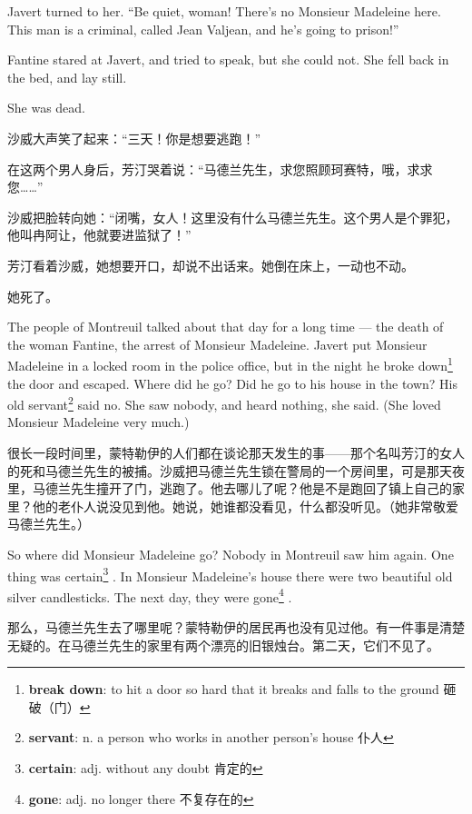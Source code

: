 \documentclass[fontset=ubuntu, zihao=5]{ctexart}
\begin{document}
\begin{paracol}{2}
  Javert turned to her. ``Be quiet, woman! There's no Monsieur Madeleine here. This man is a criminal, called Jean Valjean, and he's going to prison!''

  Fantine stared at Javert, and tried to speak, but she could not. She fell back in the bed, and lay still.

  She was dead.


  \switchcolumn

  沙威大声笑了起来：“三天！你是想要逃跑！”

  在这两个男人身后，芳汀哭着说：“马德兰先生，求您照顾珂赛特，哦，求求您……”


  沙威把脸转向她：“闭嘴，女人！这里没有什么马德兰先生。这个男人是个罪犯，他叫冉阿让，他就要进监狱了！”


  芳汀看着沙威，她想要开口，却说不出话来。她倒在床上，一动也不动。


  她死了。

  \switchcolumn*

  The people of Montreuil talked about that day for a long time --- the death of the woman Fantine, the arrest of Monsieur Madeleine. Javert put Monsieur Madeleine in a locked room in the police office, but in the night he broke down\footnote{\textbf{break down}: to hit a door so hard that it breaks and falls to the ground 砸破（门）}
  the door and escaped. Where did he go? Did he go to his house in the town? His old servant\footnote{\textbf{servant}: n. a person who works in another person's house 仆人}
  said no. She saw nobody, and heard nothing, she said. (She loved Monsieur Madeleine very much.)

  \switchcolumn

  很长一段时间里，蒙特勒伊的人们都在谈论那天发生的事——那个名叫芳汀的女人的死和马德兰先生的被捕。沙威把马德兰先生锁在警局的一个房间里，可是那天夜里，马德兰先生撞开了门，逃跑了。他去哪儿了呢？他是不是跑回了镇上自己的家里？他的老仆人说没见到他。她说，她谁都没看见，什么都没听见。（她非常敬爱马德兰先生。）

  \switchcolumn*

  So where did Monsieur Madeleine go? Nobody in Montreuil saw him again. One thing was certain\footnote{\textbf{certain}: adj. without any doubt 肯定的}
  . In Monsieur Madeleine's house there were two beautiful old silver candlesticks. The next day, they were gone\footnote{\textbf{gone}:  adj. no longer there 不复存在的}
  .

  \switchcolumn

  那么，马德兰先生去了哪里呢？蒙特勒伊的居民再也没有见过他。有一件事是清楚无疑的。在马德兰先生的家里有两个漂亮的旧银烛台。第二天，它们不见了。

\end{paracol}
\end{document}
